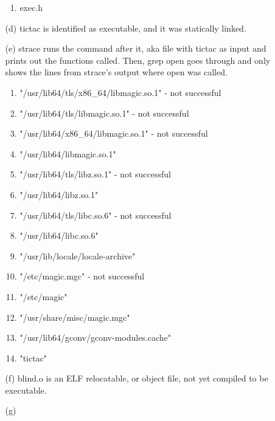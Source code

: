 \documentclass[12pt,letterpaper]{report}
\begin{document}
\begin{enumerate}
\begin{enumerate}
\begin{enumerate}
\item exec.h
\end{enumerate}
\item[(d)] tictac is identified as executable, and it was statically linked.
\item[(e)] strace runs the command after it, aka file with tictac as input and prints out the functions called. Then, grep open goes through and only shows the lines from strace's output where open was called.
\begin{enumerate}
\item "/usr/lib64/tls/x86\_64/libmagic.so.1" - not successful
\item "/usr/lib64/tls/libmagic.so.1" - not successful
\item "/usr/lib64/x86\_64/libmagic.so.1" - not successful
\item "/usr/lib64/libmagic.so.1"
\item "/usr/lib64/tls/libz.so.1" - not successful
\item "/usr/lib64/libz.so.1" 
\item "/usr/lib64/tls/libc.so.6" - not successful
\item "/usr/lib64/libc.so.6"
\item "/usr/lib/locale/locale-archive"
\item "/etc/magic.mgc" - not successful
\item "/etc/magic"
\item "/usr/share/misc/magic.mgc"
\item "/usr/lib64/gconv/gconv-modules.cache"
\item "tictac"
\end{enumerate}
\item[(f)] blind.o is an ELF relocatable, or object file, not yet compiled to be executable.
\item[(g)] 
\end{enumerate}
\end{enumerate}
\end{document}
